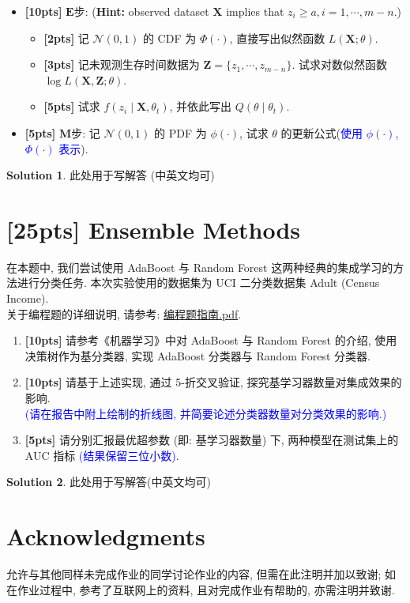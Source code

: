\documentclass[a4paper,UTF8]{article}
\numberwithin{equation}{section}
\theoremstyle{definition}
\newtheorem*{solution}{Solution}
\def \X {\mathbf{X}}
\def \Z {\mathbf{Z}}
\begin{document}
\begin{itemize}
    \item[(2)] \textbf{[10pts]} $\mathbf{E}$步: (\textbf{Hint:} observed dataset $\X$ implies that $z_i\geq a, i=1, \cdots, m-n$.)
    \begin{itemize}
    \item[(a)] \textbf{[2pts]} 记 $\mathcal{N}(0, 1)$ 的 CDF 为 $\Phi(\cdot)$, 直接写出似然函数 $L(\X; \theta)$. 
    \item[(b)] \textbf{[3pts]} 记未观测生存时间数据为 $\Z=\{z_1, \cdots, z_{m-n}\}$. 试求对数似然函数 $\log L(\X, \Z; \theta)$. 
    \item[(c)] \textbf{[5pts]} 试求 $f(z_i\mid \X, \theta_t)$, 并依此写出 $Q(\theta\mid \theta_t)$.
    \end{itemize}
    \item[(3)] \textbf{[5pts]} $\mathbf{M}$步: 记 $\mathcal{N}(0, 1)$ 的 PDF 为 $\phi(\cdot)$, 试求 $\theta$ 的更新公式(\textcolor{blue}{使用 $\phi(\cdot)$, $\Phi(\cdot)$ 表示}).
\end{itemize}

\begin{solution}
    此处用于写解答 (中英文均可)
    ~\\
\end{solution}


\newpage
\section{[25pts] Ensemble Methods}

在本题中, 我们尝试使用 AdaBoost 与 Random Forest 这两种经典的集成学习的方法进行分类任务. 本次实验使用的数据集为 UCI 二分类数据集 Adult (Census Income).\\关于编程题的详细说明, 请参考: \href{https://www.lamda.nju.edu.cn/ML2024Spring/homework/HW5/guide.pdf}{编程题指南.pdf}.


\begin{enumerate}
    \item [(1)] \textbf{[10pts]} 请参考《机器学习》中对 AdaBoost 与 Random Forest 的介绍, 使用决策树作为基分类器, 实现 AdaBoost 分类器与 Random Forest 分类器.
    \item [(2)] \textbf{[10pts]} 请基于上述实现, 通过 5-折交叉验证, 探究基学习器数量对集成效果的影响.\\\textcolor{blue}{(请在报告中附上绘制的折线图, 并简要论述分类器数量对分类效果的影响.)}
    \item [(3)] \textbf{[5pts]} 请分别汇报最优超参数 (即: 基学习器数量) 下, 两种模型在测试集上的 AUC 指标 \textcolor{blue}{(结果保留三位小数)}.
\end{enumerate}

\begin{solution}
    此处用于写解答(中英文均可)
    ~\\
\end{solution}

\newpage

\section*{Acknowledgments}
允许与其他同样未完成作业的同学讨论作业的内容, 但需在此注明并加以致谢; 如在作业过程中, 参考了互联网上的资料, 且对完成作业有帮助的, 亦需注明并致谢.
\end{document}
